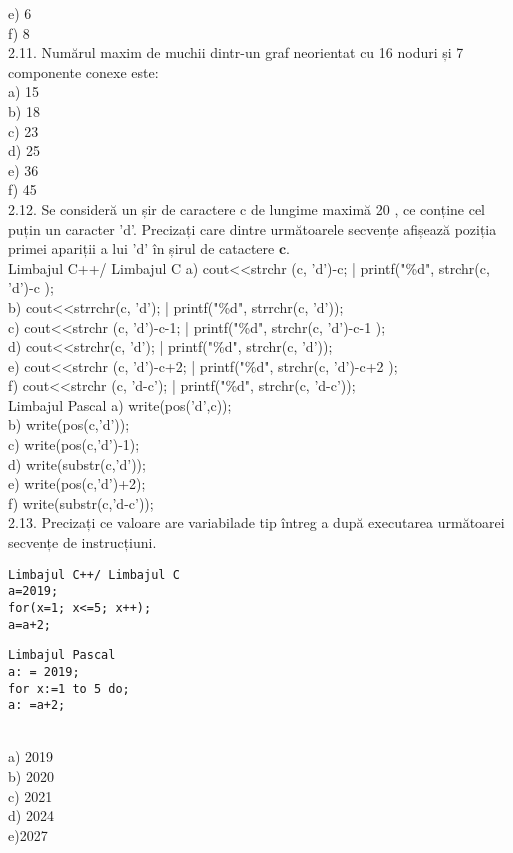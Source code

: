 e) 6
\\
f) 8
\\
2.11. Numărul maxim de muchii dintr-un graf neorientat cu 16 noduri și 7 componente conexe este:
\\
a) 15
\\
b) 18
\\
c) 23
\\
d) 25
\\
e) 36
\\
f) 45
\\
2.12. Se consideră un șir de caractere c de lungime maximă 20 , ce conține cel puțin un caracter 'd'. Precizați care dintre următoarele secvențe afișează poziția primei apariții a lui 'd' în șirul de catactere $\mathbf{c}$.
\\
Limbajul C++/ Limbajul C
a) cout<<strchr (c, 'd')-c; | printf("\%d", strchr(c, 'd')-c );
\\
b) cout<<strrchr(c, 'd'); | printf("\%d", strrchr(c, 'd'));
\\
c) cout<<strchr (c, 'd')-c-1; | printf("\%d", strchr(c, 'd')-c-1 );
\\
d) cout<<strchr(c, 'd'); | printf("\%d", strchr(c, 'd'));
\\
e) cout<<strchr (c, 'd')-c+2; | printf("\%d", strchr(c, 'd')-c+2 );
\\
f) cout<<strchr (c, 'd-c'); | printf("\%d", strchr(c, 'd-c'));
\\
Limbajul Pascal
a) write(pos('d',c));
\\
b) write(pos(c,'d'));
\\
c) write(pos(c,'d')-1);
\\
d) write(substr(c,'d'));
\\
e) write(pos(c,'d')+2);
\\
f) write(substr(c,'d-c'));
\\
2.13. Precizați ce valoare are variabilade tip întreg a după executarea următoarei secvențe de instrucțiuni.
\begin{verbatim}
Limbajul C++/ Limbajul C
a=2019;
for(x=1; x<=5; x++);
a=a+2;
\end{verbatim}
\begin{verbatim}
Limbajul Pascal
a: = 2019;
for x:=1 to 5 do;
a: =a+2;
\end{verbatim}
\\
a) 2019
\\
b) 2020
\\
c) 2021
\\
d) 2024
\\
e)2027
\\
